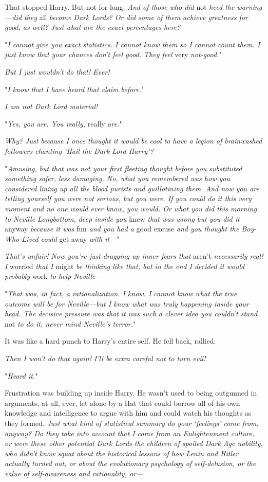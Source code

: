 That stopped Harry. But not for long. \emph{And of those who did} not 
\emph{heed the warning---did they} all \emph{become Dark Lords? Or did some of them
achieve greatness for good, as well? Just what are the exact percentages here?}

"\emph{I cannot give you exact statistics. I cannot know them so I cannot count
them. I just know that your chances don't feel good. They feel} very 
\emph{not-good.}"

\emph{But I just wouldn't do that! Ever!}

"\emph{I know that I have heard that claim before.}"

\emph{I am not Dark Lord material!}

"\emph{Yes, you are. You really,} really \emph{are.}"

\emph{Why? Just because I once thought it would be cool to have a legion of
brainwashed followers chanting `Hail the Dark Lord Harry'?}

"\emph{Amusing, but that was not your first fleeting thought before you
substituted something safer, less damaging. No, what you remembered was how you
considered lining up all the blood purists and guillotining them. And now you
are telling yourself you were not serious, but you were. If you could do it
this very moment and no one would ever know, you would. Or what you did this
morning to Neville Longbottom, deep inside you} knew \emph{that was wrong but
you did it} anyway \emph{because it was} fun \emph{and you had a} good
excuse \emph{and you thought the Boy-Who-Lived could} get away \emph{with
it}\mbox{---}"

\emph{That's unfair! Now you're just dragging up inner fears that} aren't 
\emph{necessarily real! I} worried \emph{that I} might \emph{be thinking like that,
but in the end I decided it would probably} work \emph{to help Neville---}

"\emph{That was, in fact, a rationalization. I know. I cannot know what the
true outcome will be for Neville---but I know what was truly happening inside
your head. The decisive pressure was that it was such a clever idea you
couldn't stand} not \emph{to do it, never mind Neville's terror.}"

It was like a hard punch to Harry's entire self. He fell back, rallied:

\emph{Then I won't do that again! I'll be extra careful not to turn evil!}

"\emph{Heard it.}"

Frustration was building up inside Harry. He wasn't used to being outgunned in
arguments, at all, ever, let alone by a Hat that could borrow all of his own
knowledge and intelligence to argue with him and could watch his thoughts as
they formed. \emph{Just what kind of statistical summary do your `feelings'
come from, anyway? Do they take into account that I come from an Enlightenment
culture, or were these other potential Dark Lords the children of spoiled Dark
Age nobility, who didn't know squat about the historical lessons of how Lenin
and Hitler actually turned out, or about the evolutionary psychology of
self-delusion, or the value of self-awareness and rationality, or---}

